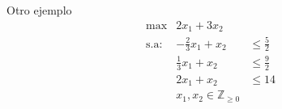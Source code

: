 \documentclass[10pt, aspectratio=169]{beamer}
\begin{document}

\begin{frame}{Otro ejemplo}
    \[
    \begin{array}{rrl}
        \max & 2x_1+3x_2 & \\
        \text{s.a:} & -\frac{2}{3}x_1 + x_2 & \leq \frac{5}{2} \\
        & \frac{1}{3}x_1 + x_2 & \leq \frac{9}{2} \\
        & 2x_1 + x_2 & \leq 14 \\
        & x_1, x_2\in\mathbb{Z}_{\geq 0} &
    \end{array}
    \]
\end{frame}
\end{document}
